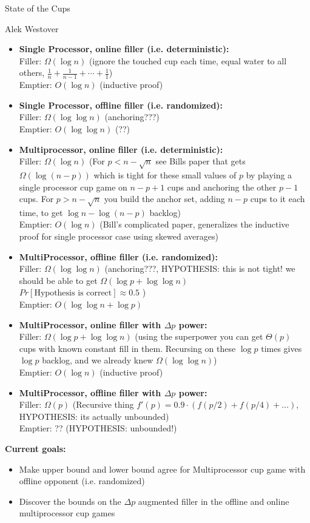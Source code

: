 \documentclass{article}[11pt]
\begin{document}
\begin{center}
\begin{Large}
  State of the Cups\\
	\vspace{2mm}
\end{Large}
	Alek Westover \\
\end{center}

\begin{itemize}
  \item \textbf{Single Processor, online filler (i.e. deterministic): } \\
    Filler: $\Omega(\log n)$ (ignore the touched cup each time, equal water to all others, $\frac{1}{n}+\frac{1}{n-1}  + \cdots + \frac{1}{1}$)\\
    Emptier: $O(\log n)$ (inductive proof)
  \item \textbf{Single Processor, offline filler (i.e. randomized): } \\
    Filler: $\Omega(\log\log n)$ (anchoring???) \\
    Emptier: $O(\log\log n)$ (??)
  \item \textbf{Multiprocessor, online filler (i.e. deterministic): } \\
    Filler: $\Omega(\log n)$ (For $p < n-\sqrt{n}$ see Bills paper that gets $\Omega(\log (n-p))$ which is tight for these small values of $p$ by playing a single processor cup game on $n-p+1$ cups and anchoring the other $p-1$ cups. For $p>n-\sqrt{n}$ you build the anchor set, adding $n-p$ cups to it each time, to get $\log n - \log (n-p)$ backlog)\\
    Emptier: $O(\log n)$ (Bill's complicated paper, generalizes the inductive proof for single processor case using skewed averages)
  \item \textbf{MultiProcessor, offline filler (i.e. randomized): } \\
    Filler: $\Omega(\log\log n)$ (anchoring???, HYPOTHESIS: this is not tight! we should be able to get $\Omega(\log p + \log \log n)$ $Pr[\text{Hypothesis is correct}] \approx 0.5$ ) \\
    Emptier: $O(\log\log n + \log p)$  
  \item \textbf{MultiProcessor, online filler with $\Delta p$ power: } \\
    Filler: $\Omega(\log p + \log \log n)$ (using the superpower you can get $\Theta(p)$ cups with known constant fill in them. Recursing on these $\log p$ times gives $\log p$ backlog, and we already knew $\Omega(\log\log n)$)\\
    Emptier: $O(\log n)$ (inductive proof)
  \item \textbf{MultiProcessor, offline filler with $\Delta p$ power: } \\
    Filler: $\Omega(p)$ (Recursive thing $f'(p) = 0.9\cdot(f(p/2) + f(p/4) + \ldots)$, HYPOTHESIS: its actually unbounded) \\
    Emptier:  ?? (HYPOTHESIS: unbounded!)
  
\end{itemize}

\textbf{Current goals:}
\begin{itemize}
  \item Make upper bound and lower bound agree for Multiprocessor cup game with offline opponent (i.e. randomized)
  \item Discover the bounds on the $\Delta p$ augmented filler in the offline and online multiprocessor cup games
\end{itemize}
\end{document}
